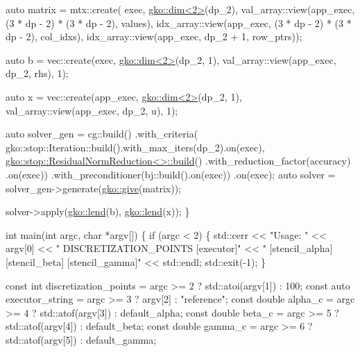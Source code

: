 \begin{DoxyCodeInclude}
    \textcolor{keyword}{auto} matrix = mtx::create(
        exec, \hyperlink{structgko_1_1dim}{gko::dim<2>}(dp\_2),
        val\_array::view(app\_exec, (3 * dp - 2) * (3 * dp - 2), values),
        idx\_array::view(app\_exec, (3 * dp - 2) * (3 * dp - 2), col\_idxs),
        idx\_array::view(app\_exec, dp\_2 + 1, row\_ptrs));

    \textcolor{keyword}{auto} b = vec::create(exec, \hyperlink{structgko_1_1dim}{gko::dim<2>}(dp\_2, 1),
                         val\_array::view(app\_exec, dp\_2, rhs), 1);

    \textcolor{keyword}{auto} x = vec::create(app\_exec, \hyperlink{structgko_1_1dim}{gko::dim<2>}(dp\_2, 1),
                         val\_array::view(app\_exec, dp\_2, u), 1);

    \textcolor{keyword}{auto} solver\_gen =
        cg::build()
            .with\_criteria(
                gko::stop::Iteration::build().with\_max\_iters(dp\_2).on(exec),
                \hyperlink{classgko_1_1stop_1_1ResidualNormReduction}{gko::stop::ResidualNormReduction<>::build}()
                    .with\_reduction\_factor(accuracy)
                    .on(exec))
            .with\_preconditioner(bj::build().on(exec))
            .on(exec);
    \textcolor{keyword}{auto} solver = solver\_gen->generate(\hyperlink{namespacegko_acbd3fd6d07e498892881e8e2ab0b4167}{gko::give}(matrix));

    solver->apply(\hyperlink{namespacegko_aa8cb4876b72e5e1036ea9575443c439b}{gko::lend}(b), \hyperlink{namespacegko_aa8cb4876b72e5e1036ea9575443c439b}{gko::lend}(x));
\}


\textcolor{keywordtype}{int} main(\textcolor{keywordtype}{int} argc, \textcolor{keywordtype}{char} *argv[])
\{
    \textcolor{keywordflow}{if} (argc < 2) \{
        std::cerr << \textcolor{stringliteral}{"Usage: "} << argv[0] << \textcolor{stringliteral}{" DISCRETIZATION\_POINTS [executor]"}
                  << \textcolor{stringliteral}{" [stencil\_alpha] [stencil\_beta] [stencil\_gamma]"}
                  << std::endl;
        std::exit(-1);
    \}

    \textcolor{keyword}{const} \textcolor{keywordtype}{int} discretization\_points = argc >= 2 ? std::atoi(argv[1]) : 100;
    \textcolor{keyword}{const} \textcolor{keyword}{auto} executor\_string = argc >= 3 ? argv[2] : \textcolor{stringliteral}{"reference"};
    \textcolor{keyword}{const} \textcolor{keywordtype}{double} alpha\_c = argc >= 4 ? std::atof(argv[3]) : default\_alpha;
    \textcolor{keyword}{const} \textcolor{keywordtype}{double} beta\_c = argc >= 5 ? std::atof(argv[4]) : default\_beta;
    \textcolor{keyword}{const} \textcolor{keywordtype}{double} gamma\_c = argc >= 6 ? std::atof(argv[5]) : default\_gamma;


\end{DoxyCodeInclude}
